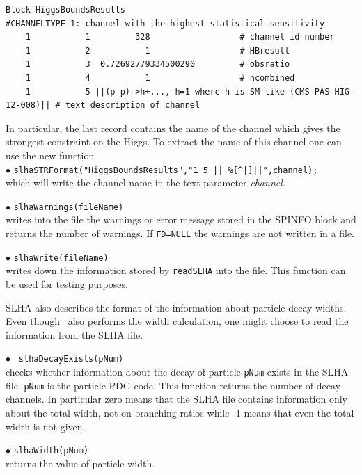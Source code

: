 \documentclass[12pt,a4paper]{article}
\begin{document}
{\scriptsize
\begin{verbatim}
Block HiggsBoundsResults 
#CHANNELTYPE 1: channel with the highest statistical sensitivity
    1           1         328                  # channel id number
    1           2           1                  # HBresult
    1           3  0.72692779334500290         # obsratio
    1           4           1                  # ncombined
    1           5 ||(p p)->h+..., h=1 where h is SM-like (CMS-PAS-HIG-12-008)|| # text description of channel
\end{verbatim}
}

\noindent 
In particular, the last record contains  the  name of the channel which gives the strongest constraint on the Higgs.  To extract the name
of this channel one can use the new function\\

\noindent
$\bullet$ \verb!slhaSTRFormat("HiggsBoundsResults","1 5 || %[^|]||",channel);!\\
which will write the channel name  in the text parameter {\it channel}. 

\noindent
$\bullet$ \verb|slhaWarnings(fileName)|\\                                                                              
writes into the file the warnings or error message  stored in the SPINFO block and
returns the number of warnings. If \verb|FD=NULL| the warnings are not written in a file.

\noindent
$\bullet$ \verb|slhaWrite(fileName)|\\
 writes down the information stored by 
\verb|readSLHA| into the file. This function can be used for testing purposes. 

SLHA  also describes the format of the information about particle decay widths.  
Even though \micro\ also performs the width calculation, one might choose to read the information from the SLHA file. 
 


\noindent
$\bullet$ \verb| slhaDecayExists(pNum)|\\
checks whether information about the  decay of particle \verb|pNum| exists in the SLHA file. 
\verb|pNum| is the particle PDG code. This function returns the number 
of decay channels. 
In particular zero means that the SLHA file contains  information only about the total width, not on branching ratios while 
-1 means that even the total width is not given.

\noindent
$\bullet$ \verb|slhaWidth(pNum)|\\ returns the value of particle width.
\end{document}
